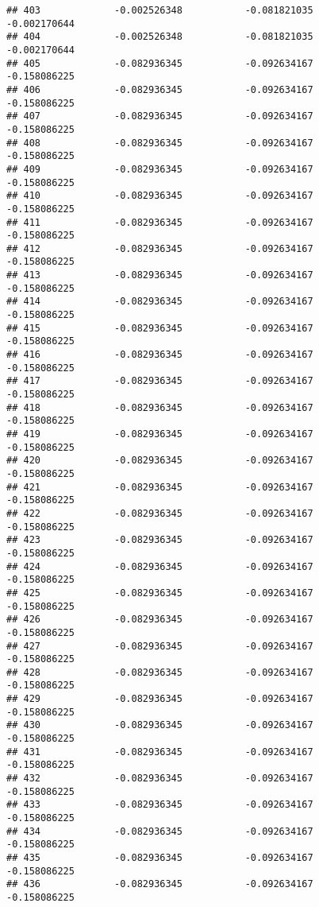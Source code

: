 \documentclass[]{article}
\begin{document}
\begin{verbatim}
## 403             -0.002526348           -0.081821035           -0.002170644
## 404             -0.002526348           -0.081821035           -0.002170644
## 405             -0.082936345           -0.092634167           -0.158086225
## 406             -0.082936345           -0.092634167           -0.158086225
## 407             -0.082936345           -0.092634167           -0.158086225
## 408             -0.082936345           -0.092634167           -0.158086225
## 409             -0.082936345           -0.092634167           -0.158086225
## 410             -0.082936345           -0.092634167           -0.158086225
## 411             -0.082936345           -0.092634167           -0.158086225
## 412             -0.082936345           -0.092634167           -0.158086225
## 413             -0.082936345           -0.092634167           -0.158086225
## 414             -0.082936345           -0.092634167           -0.158086225
## 415             -0.082936345           -0.092634167           -0.158086225
## 416             -0.082936345           -0.092634167           -0.158086225
## 417             -0.082936345           -0.092634167           -0.158086225
## 418             -0.082936345           -0.092634167           -0.158086225
## 419             -0.082936345           -0.092634167           -0.158086225
## 420             -0.082936345           -0.092634167           -0.158086225
## 421             -0.082936345           -0.092634167           -0.158086225
## 422             -0.082936345           -0.092634167           -0.158086225
## 423             -0.082936345           -0.092634167           -0.158086225
## 424             -0.082936345           -0.092634167           -0.158086225
## 425             -0.082936345           -0.092634167           -0.158086225
## 426             -0.082936345           -0.092634167           -0.158086225
## 427             -0.082936345           -0.092634167           -0.158086225
## 428             -0.082936345           -0.092634167           -0.158086225
## 429             -0.082936345           -0.092634167           -0.158086225
## 430             -0.082936345           -0.092634167           -0.158086225
## 431             -0.082936345           -0.092634167           -0.158086225
## 432             -0.082936345           -0.092634167           -0.158086225
## 433             -0.082936345           -0.092634167           -0.158086225
## 434             -0.082936345           -0.092634167           -0.158086225
## 435             -0.082936345           -0.092634167           -0.158086225
## 436             -0.082936345           -0.092634167           -0.158086225

\end{verbatim}
\end{document}

